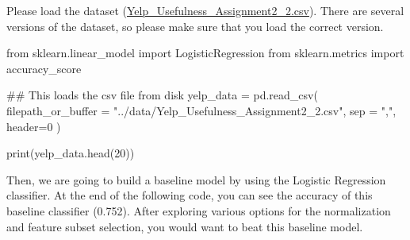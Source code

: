 \documentclass[
  letterpaper,
]{scrbook}
\newenvironment{Shaded}{\begin{snugshade}}{\end{snugshade}}
\newcommand{\BuiltInTok}[1]{\textcolor[rgb]{0.00,0.23,0.31}{#1}}
\newcommand{\CommentTok}[1]{\textcolor[rgb]{0.37,0.37,0.37}{#1}}
\newcommand{\DecValTok}[1]{\textcolor[rgb]{0.68,0.00,0.00}{#1}}
\newcommand{\ImportTok}[1]{\textcolor[rgb]{0.00,0.46,0.62}{#1}}
\newcommand{\NormalTok}[1]{\textcolor[rgb]{0.00,0.23,0.31}{#1}}
\newcommand{\OperatorTok}[1]{\textcolor[rgb]{0.37,0.37,0.37}{#1}}
\newcommand{\StringTok}[1]{\textcolor[rgb]{0.13,0.47,0.30}{#1}}
\begin{document}
Please load the dataset
(\href{../data/Yelp_Usefulness_Assignment2_2.csv}{Yelp\_Usefulness\_Assignment2\_2.csv}).
There are several versions of the dataset, so please make sure that you
load the correct version.

\begin{Shaded}
\begin{Highlighting}[]
\ImportTok{from}\NormalTok{ sklearn.linear\_model }\ImportTok{import}\NormalTok{ LogisticRegression}
\ImportTok{from}\NormalTok{ sklearn.metrics }\ImportTok{import}\NormalTok{ accuracy\_score}

\CommentTok{\#\# This loads the csv file from disk}
\NormalTok{yelp\_data }\OperatorTok{=}\NormalTok{ pd.read\_csv(}
\NormalTok{    filepath\_or\_buffer }\OperatorTok{=} \StringTok{"../data/Yelp\_Usefulness\_Assignment2\_2.csv"}\NormalTok{, sep }\OperatorTok{=} \StringTok{","}\NormalTok{, header}\OperatorTok{=}\DecValTok{0}\NormalTok{ )}

\BuiltInTok{print}\NormalTok{(yelp\_data.head(}\DecValTok{20}\NormalTok{))}
\end{Highlighting}
\end{Shaded}

Then, we are going to build a baseline model by using the Logistic
Regression classifier. At the end of the following code, you can see the
accuracy of this baseline classifier (0.752). After exploring various
options for the normalization and feature subset selection, you would
want to beat this baseline model.
\end{document}
